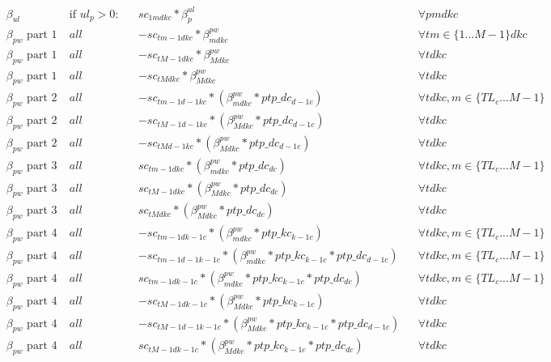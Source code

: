 \begin{equation}
	\begin{alignedat}{10}
		& \beta_{ul} && \text{if } ul_{p} >0: && sc_{1mdkc} * \beta_{p}^{ul}  && \forall pmdkc \\
		& \beta_{pw} \text{ part 1 } && all && - sc_{tm-1dkc} * \beta_{mdkc}^{pw} && \forall tm\in\{1...M-1\}dkc \\
		& \beta_{pw} \text{ part 1 } && all && - sc_{tM-1dkc} * \beta_{Mdkc}^{pw} && \forall tdkc \\
		& \beta_{pw} \text{ part 1 } && all && - sc_{tMdkc} * \beta_{Mdkc}^{pw} && \forall tdkc \\
		& \beta_{pw} \text{ part 2 } && all && - sc_{tm-1d-1kc} * (\beta_{mdkc}^{pw} * ptp\_dc_{d-1c}) && \forall tdkc, m \in \{TL_{c} ... M-1 \} \\
		& \beta_{pw} \text{ part 2 } && all && - sc_{tM-1d-1kc} * (\beta_{Mdkc}^{pw} * ptp\_dc_{d-1c}) && \forall tdkc \\
		& \beta_{pw} \text{ part 2 } && all && - sc_{tMd-1kc} * (\beta_{Mdkc}^{pw} * ptp\_dc_{d-1c}) && \forall tdkc \\ 
		& \beta_{pw} \text{ part 3 } && all && sc_{tm-1dkc} * (\beta_{mdkc}^{pw} * ptp\_dc_{dc}) && \forall tdkc, m \in \{TL_{c} ... M-1 \} \\
		& \beta_{pw} \text{ part 3 } && all && sc_{tM-1dkc} * (\beta_{Mdkc}^{pw} * ptp\_dc_{dc}) && \forall tdkc \\
		& \beta_{pw} \text{ part 3 } && all && sc_{tMdkc} * (\beta_{Mdkc}^{pw} * ptp\_dc_{dc}) && \forall tdkc \\
		& \beta_{pw} \text{ part 4 } && all && -sc_{tm-1dk-1c} * (\beta_{mdkc}^{pw} * ptp\_kc_{k-1c}) && \forall tdkc, m \in \{ TL_{c} ... M-1 \} \\
		& \beta_{pw} \text{ part 4 } && all && -sc_{tm-1d-1k-1c} * (\beta_{mdkc}^{pw} * ptp\_kc_{k-1c} * ptp\_dc_{d-1c}) && \forall tdkc, m \in \{ TL_{c} ... M-1 \} \\ 
		& \beta_{pw} \text{ part 4 } && all && sc_{tm-1dk-1c} * (\beta_{mdkc}^{pw} * ptp\_kc_{k-1c} * ptp\_dc_{dc}) && \forall tdkc, m \in \{ TL_{c} ... M-1 \} \\
		& \beta_{pw} \text{ part 4 } && all && -sc_{tM-1dk-1c} * (\beta_{Mdkc}^{pw} * ptp\_kc_{k-1c}) && \forall tdkc \\
		& \beta_{pw} \text{ part 4 } && all && -sc_{tM-1d-1k-1c} * (\beta_{Mdkc}^{pw} * ptp\_kc_{k-1c} * ptp\_dc_{d-1c}) && \forall tdkc \\ 
		& \beta_{pw} \text{ part 4 } && all && sc_{tM-1dk-1c} * (\beta_{Mdkc}^{pw} * ptp\_kc_{k-1c} * ptp\_dc_{dc}) && \forall tdkc  \\

\end{alignedat}
\end{equation}
